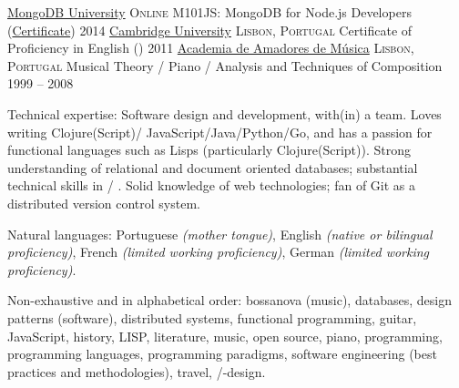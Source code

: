 \documentclass[10pt,a4paper]{article}
\begin{document}
\spacedhrule{0.5em}{-0.4em}

\headedsection
  {\href{https://university.mongodb.com}{MongoDB University}}
  {\textsc{Online}} {
  \headedsubsection
    {M101JS: MongoDB for Node.js Developers (\href{http://education.mongodb.com/downloads/certificates/b5bebce320c047bda51f89482ff28948/Certificate.pdf}{Certificate})}
    {2014}
    {}
}
\headedsection
  {\href{http://www.cambridgeenglish.org/}{Cambridge University}}
  {\textsc{Lisbon, Portugal}} {
  \headedsubsection
    {Certificate of Proficiency in English ()}
    {2011}
    {}
}
\headedsection
  {\href{http://www.academiaam.com/}{Academia de Amadores de Música}}
  {\textsc{Lisbon, Portugal}} {
  \headedsubsection
    {Musical Theory / Piano / Analysis and Techniques of Composition}
    {1999 -- 2008}
    {}
}

\spacedhrule{0.5em}{-0.4em}

\inlineheadsection  %
  {Technical expertise:}
  {Software design and development, with(in) a team. Loves writing Clojure(Script)/\nsp
JavaScript/\nsp Java/\nsp Python/\nsp Go, and has a passion for functional languages
such as Lisps (particularly Clojure(Script)). Strong understanding of relational
and document oriented databases; substantial technical skills in /\nsp
{}. Solid knowledge of web technologies; fan of Git as a distributed version
control system.}

\vspace{0.5em}
\inlineheadsection
  {Natural languages:}
  {Portuguese \emph{(mother tongue)}, English \emph{(native or bilingual proficiency)},
French \emph{(limited working proficiency)}, German \emph{(limited working proficiency)}.}

\spacedhrule{1.6em}{-0.4em}


\inlineheadsection
  {Non-exhaustive and in alphabetical order:}
  {bossanova (music), databases, design patterns (software), distributed systems,
functional programming, guitar, JavaScript, history, LISP, literature, music, open
source, piano, programming, programming languages, programming paradigms, software
engineering (best practices and methodologies), travel, /-design.}
\end{document}
